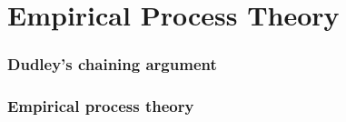 \part{Empirical Process Theory}




%
%
\section{Dudley's chaining argument}



%
%
\section{Empirical process theory}
